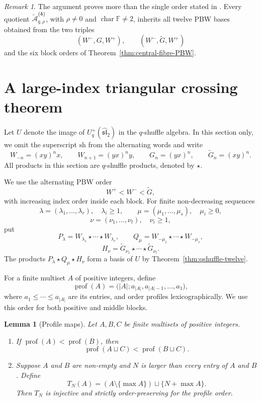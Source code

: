 \documentclass[11pt]{extarticle}
\newtheorem{lemma}[theorem]{Lemma}
\theoremstyle{definition}
\theoremstyle{remark}
\newtheorem{remark}[theorem]{Remark}
\numberwithin{equation}{section}
\newcommand{\F}{\mathbb F}
\newcommand{\BBqquot}[2]{\widetilde{\mathcal A}_{q,#1}^{\{#2\}}}
\newcommand{\Uplus}{U_q^+(\widehat{\mathfrak{sl}}_2)}
\newcommand{\sh}{\mathrm{sh}}
\begin{document}
\begin{remark}
The argument proves more than the single order stated in
\cite[Conjecture~1]{BaseilhacBelliard2017}.  Every quotient
\(\BBqquot{\rho}{\boldsymbol\delta}\), with
\(\rho\neq0\) and \(\operatorname{char}\F\neq2\), inherits all twelve PBW
bases obtained from the two triples
\[
        (W^-,G,W^+),
        \qquad
        (W^-,\widetilde G,W^+)
\]
and the six block orders of Theorem~\ref{thm:central-fibre-PBW}.
\end{remark}





\section{A large-index triangular crossing theorem}
\label{sec:large-crossing}

Let $U$ denote the image of $\Uplus$ in the $q$-shuffle algebra.  In this
section only, we omit the superscript $\sh$ from the alternating words and
write
\[
 W_{-n}=(xy)^nx,\qquad
 W_{n+1}=(yx)^ny,\qquad
 G_n=(yx)^n,\qquad
 \widetilde G_n=(xy)^n.
\]
All products in this section are $q$-shuffle products, denoted by $\star$.

We use the alternating PBW order
\[
        W^+<W^-<\widetilde G,
\]
with increasing index order inside each block.  For finite non-decreasing
sequences
\[
 \lambda=(\lambda_1,\ldots,\lambda_r),\quad \lambda_i\geq1,
 \qquad
 \mu=(\mu_1,\ldots,\mu_s),\quad \mu_i\geq0,
\]
\[
 \nu=(\nu_1,\ldots,\nu_t),\quad \nu_i\geq1,
\]
put
\[
 P_\lambda=W_{\lambda_1}\star\cdots\star W_{\lambda_r},\qquad
 Q_\mu=W_{-\mu_1}\star\cdots\star W_{-\mu_s},
\]
\[
 H_\nu=\widetilde G_{\nu_1}\star\cdots\star
       \widetilde G_{\nu_t}.
\]
The products $P_\lambda\star Q_\mu\star H_\nu$ form a basis of $U$ by
Theorem~\ref{thm:qshuffle-twelve}.

For a finite multiset $A$ of positive integers, define
\[
 \operatorname{prof}(A)
 =\bigl(|A|;a_{|A|},a_{|A|-1},\ldots,a_1\bigr),
\]
where $a_1\leq\cdots\leq a_{|A|}$ are its entries, and order profiles
lexicographically.  We use this order for both positive and middle blocks.

\begin{lemma}[Profile maps]
\label{lem:profile-maps}
Let $A,B,C$ be finite multisets of positive integers.
\begin{enumerate}[label=\textup{(\roman*)}]
\item If $\operatorname{prof}(A)<\operatorname{prof}(B)$, then
\[
 \operatorname{prof}(A\sqcup C)<\operatorname{prof}(B\sqcup C).
\]
\item Suppose $A$ and $B$ are non-empty and $N$ is larger than every entry
of $A$ and $B$.  Define
\[
 T_N(A)=(A\setminus\{\max A\})\sqcup\{N+\max A\}.
\]
Then $T_N$ is injective and strictly order-preserving for the profile order.
\end{enumerate}
\end{lemma}
\end{document}
